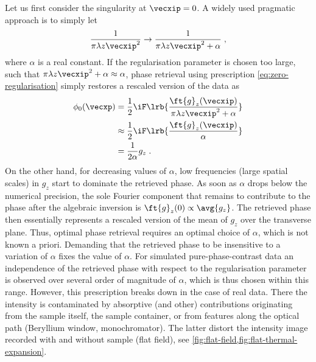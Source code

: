 \documentclass[
twoside,
openright,
titlepage,
numbers=noenddot,
headinclude,
fleqn,
a4paper,
footinclude=true,
cleardoublepage=empty,
abstractoff,
BCOR=5mm,
paper=a4,
fontsize=11pt,
british,ngerman,american,
]{scrreprt}
\begin{document}
Let us first consider the singularity at $\vecxip=0$.  A widely used
pragmatic approach is to simply let
\begin{equation}
  \label{eq:zero-regularisation}
  \frac{1}{\pi\lambda z\vecxip^2}\to 
  \frac{1}{\pi\lambda z\vecxip^2+\alpha} \;,
\end{equation}
where $\alpha$ is a real constant.  If the regularisation parameter is
chosen too large, such that $\pi\lambda
z\vecxip^2+\alpha\approx\alpha$, phase retrieval using prescription
\eqref{eq:zero-regularisation} simply restores a rescaled version of
the data as
\begin{equation}
  \begin{split}
    \label{eq:large-alpha}
        \phi_0(\vecxp)  
    & = \frac12\iF\lrb{\frac{\ft{g}_z(\vecxip)}
      {\pi\lambda z\vecxip^2 + \alpha}} 
    \\ & \approx \frac12\iF\lrb{\frac{\ft{g}_z(\vecxip)}{\alpha}}
    \\ & = \frac{1}{2\alpha} g_z \;.
  \end{split}
\end{equation}
On the other hand, for decreasing values of $\alpha$, low frequencies
(large spatial scales) in $g_z$ start to dominate the retrieved phase.
As soon as $\alpha$ drops below the numerical precision, the sole
Fourier component that remains to contribute to the phase after the
algebraic inversion is $\ft{g}_z(0)\propto\avg{g_z}$.  The retrieved
phase then essentially represents a rescaled version of the mean of
$g_z$ over the transverse plane.  Thus, optimal phase retrieval
requires an optimal choice of $\alpha$, which is not known a priori.
Demanding that the retrieved phase to be insensitive to a variation of
$\alpha$ fixes the value of $\alpha$.  For simulated
pure-phase-contrast data an independence of the retrieved phase with
respect to the regularisation parameter is observed over several order
of magnitude of $\alpha$, which is thus chosen within this range.
However, this prescription breaks down in the case of real data.
There the intensity is contaminated by absorptive (and other)
contributions originating from the sample itself, the sample
container, or from features along the optical path (Beryllium window,
monochromator).  The latter distort the intensity image recorded with
and without sample (flat field), see
\cref{fig:flat-field,fig:flat-thermal-expansion}.
\end{document}
